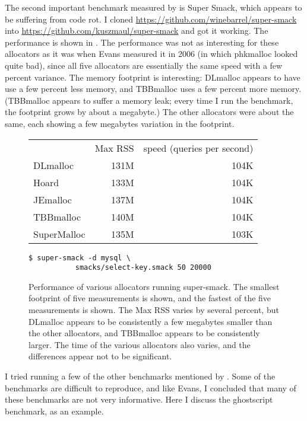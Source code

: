 \documentclass[natbib,sort&compress,10pt]{sigplanconf}
\begin{document}
The second important benchmark measured by \cite{Evans06} is Super
Smack, which appears to be suffering from code rot.  I cloned
\url{https://github.com/winebarrel/super-smack} into
\url{https://github.com/kuszmaul/super-smack} and got it working.  The
performance is shown in .  The performance was not
as interesting for these allocators as it was when Evans measured it
in 2006 (in which phkmalloc looked quite bad), since all five
allocators are essentially the same speed with a few percent variance.
The memory footprint is interesting: DLmalloc appears to have use a
few percent less memory, and TBBmalloc uses a few percent more
memory. (TBBmalloc appears to suffer a memory leak; every time I run
the benchmark, the footprint grows by about a megabyte.)  The other
allocators were about the same, each showing a few megabytes variation
in the footprint.

\begin{figure}
\begin{center}
\begin{tabular}{lrr}
 & Max RSS & speed (queries per second)\\
 DLmalloc     &131M  &  104K \\
 Hoard        &133M  &  104K \\
 JEmalloc     &137M  &  104K \\
 TBBmalloc    &140M  &  104K \\
 SuperMalloc  &135M  &  103K
\end{tabular}
\end{center}
\begin{verbatim}
$ super-smack -d mysql \
           smacks/select-key.smack 50 20000
\end{verbatim}
\caption{Performance of various allocators running super-smack.  The
  smallest footprint of five measurements is shown, and the fastest of
  the five measurements is shown.  The Max RSS varies by several
  percent, but DLmalloc appears to be consistently a few megabytes
  smaller than the other allocators, and TBBmalloc appears to be
  consistently larger.  The time of the various allocators also
  varies, and the differences appear not to be significant.}
\label{fig:supersmack}
\end{figure}

I tried running a few of the other benchmarks mentioned by
\cite{Evans06}.  Some of the benchmarks are difficult to reproduce,
and like Evans, I concluded that many of these benchmarks are not very
informative.  Here I discuss the ghostscript benchmark, as an example.
\end{document}
